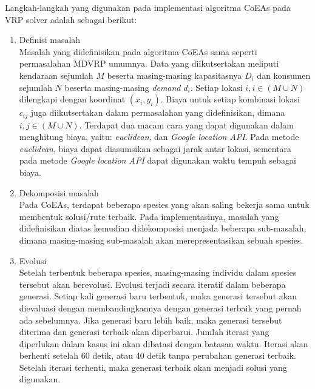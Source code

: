Langkah-langkah yang digunakan pada implementasi algoritma CoEAs pada VRP solver adalah sebagai berikut:
\begin{enumerate}
\item Definisi masalah \\
Masalah yang didefinisikan pada algoritma CoEAs sama seperti permasalahan MDVRP umumnya. Data yang diikutsertakan meliputi kendaraan sejumlah $M$ beserta masing-masing kapasitasnya $D_i$ dan konsumen sejumlah $N$ beserta masing-masing \textit{demand} $d_i$. Setiap lokasi $i, i \in (M \cup N)$ dilengkapi dengan koordinat $(x_i, y_i)$. Biaya untuk setiap kombinasi lokasi $c_{ij}$ juga diikutsertakan dalam permasalahan yang didefinisikan, dimana $i, j \in (M \cup N)$. Terdapat dua macam cara yang dapat digunakan dalam menghitung biaya, yaitu: \textit{euclidean}, dan \textit{Google location API}. Pada metode \textit{euclidean}, biaya dapat diasumsikan sebagai jarak antar lokasi, sementara pada metode \textit{Google location API} dapat digunakan waktu tempuh sebagai biaya.
\item Dekomposisi masalah \\
Pada CoEAs, terdapat beberapa spesies yang akan saling bekerja sama untuk membentuk solusi/rute terbaik. Pada implementasinya, masalah yang didefinisikan diatas kemudian didekomposisi menjada beberapa sub-masalah, dimana masing-masing sub-masalah akan merepresentasikan sebuah spesies.
\item Evolusi \\
Setelah terbentuk beberapa spesies, masing-masing individu dalam spesies tersebut akan berevolusi. Evolusi terjadi secara iteratif dalam beberapa generasi. Setiap kali generasi baru terbentuk, maka generasi tersebut akan dievaluasi dengan membandingkannya dengan generasi terbaik yang pernah ada sebelumnya. Jika generasi baru lebih baik, maka generasi tersebut diterima dan generasi terbaik akan diperbarui. Jumlah iterasi yang diperlukan dalam kasus ini akan dibatasi dengan batasan waktu. Iterasi akan berhenti setelah 60 detik, atau 40 detik tanpa perubahan generasi terbaik. Setelah iterasi terhenti, maka generasi terbaik akan menjadi solusi yang digunakan.
\end{enumerate}


